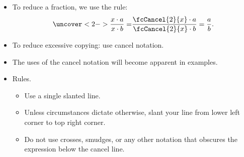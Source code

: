 \begin{frame}
\begin{itemize}
\item To reduce a fraction, we use the rule:
\[
\uncover<2->{ \frac{x \cdot a}{x\cdot  b} =}\frac{\fcCancel{2}{x}\cdot a}{\fcCancel{2}{x}\cdot b}= \frac{a}{b}.
\]
\item<2-> To reduce excessive copying: use cancel notation.
\item<3-> The uses of the cancel notation will become apparent in examples.
\item<4-> Rules. 
\begin{itemize}
\item Use a single slanted line. 
\item Unless circumstances dictate otherwise, slant your line from lower left corner to top right corner. 
\item Do not use crosses, smudges, or any other notation that obscures the expression below the cancel line.
\end{itemize}

\end{itemize}


\end{frame}